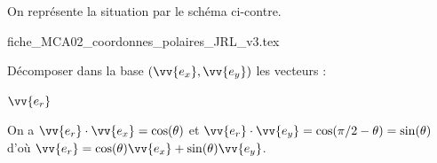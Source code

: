 \smallskip

On représente la situation par le schéma ci-contre.
                                \initialisationPartieDroite %
\begin{center}
{fiche_MCA02_coordonnes_polaires_JRL_v3.tex}
\end{center}
                               \finalisationDuPartageDePage %


\hauteurLargeurCadreReponse		{7mm}{4.5cm}
\initialisationEntrainement


Décomposer dans la base $(\vv{e_x}, \vv{e_y})$ les vecteurs : 

\debutEntrainement


\begin{enonce}
	$\vv{e_r}$
\end{enonce}


\begin{corrige}
On a  $\vv{e_r}\cdot\vv{e_x}=\cos(\theta)$ et  $\vv{e_r}\cdot\vv{e_y}=\cos(\pi/2-\theta)=\sin(\theta)$ d'où $\vv{e_r}=\cos(\theta) \vv{e_x} + \sin (\theta) \vv{e_y}$.
\end{corrige}



